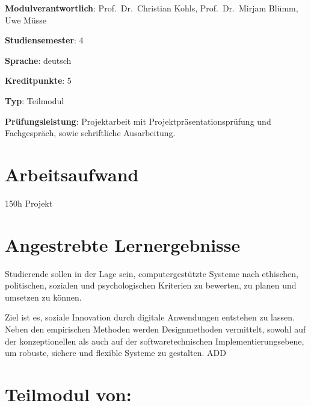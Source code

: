 \begin{modulHead}
\textbf{Modulverantwortlich}: Prof.~Dr.~Christian
Kohls, Prof.~Dr.~Mirjam Blümm, Uwe
Müsse
\end{modulHead}
\begin{modulHead}
\textbf{Studiensemester}:
4
\end{modulHead}
\begin{modulHead}
\textbf{Sprache}:
deutsch
\end{modulHead}
\begin{modulHead}
\textbf{Kreditpunkte}:
5
\end{modulHead}
\begin{modulHead}
\textbf{Typ}:
Teilmodul
\end{modulHead}
\begin{modulHead}
\textbf{Prüfungsleistung}:
Projektarbeit mit Projektpräsentationsprüfung und Fachgespräch, sowie
schriftliche Ausarbeitung.
\end{modulHead}


\hypertarget{arbeitsaufwandpathlabelmi-2017modulbeschreibungen-bachelorba_sc_projekt}{%
\section*{Arbeitsaufwand\label{/mi-2017/modulbeschreibungen-bachelor/BA_SC_Projekt}}\label{arbeitsaufwandpathlabelmi-2017modulbeschreibungen-bachelorba_sc_projekt}}

150h Projekt

\hypertarget{angestrebte-lernergebnissepathlabelmi-2017modulbeschreibungen-bachelorba_sc_projekt}{%
\section*{Angestrebte
Lernergebnisse\label{/mi-2017/modulbeschreibungen-bachelor/BA_SC_Projekt}}\label{angestrebte-lernergebnissepathlabelmi-2017modulbeschreibungen-bachelorba_sc_projekt}}

Studierende sollen in der Lage sein, computergestützte Systeme nach
ethischen, politischen, sozialen und psychologischen Kriterien zu
bewerten, zu planen und umsetzen zu können.

Ziel ist es, soziale Innovation durch digitale Anwendungen entstehen zu
lassen. Neben den empirischen Methoden werden Designmethoden vermittelt,
sowohl auf der konzeptionellen als auch auf der softwaretechnischen
Implementierungsebene, um robuste, sichere und flexible Systeme zu
gestalten. ADD

\hypertarget{teilmodul-vonpathlabelmi-2017modulbeschreibungen-bachelorba_sc_projekt}{%
\section*{Teilmodul
von:\label{/mi-2017/modulbeschreibungen-bachelor/BA_SC_Projekt}}\label{teilmodul-vonpathlabelmi-2017modulbeschreibungen-bachelorba_sc_projekt}}

